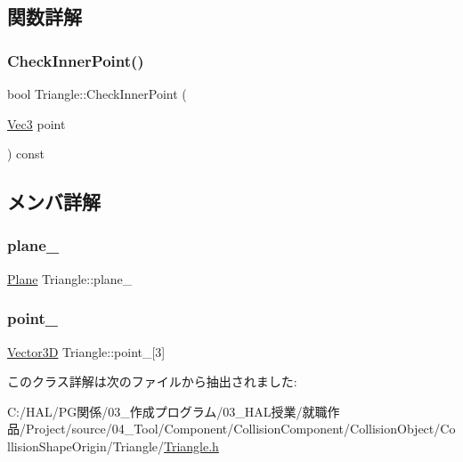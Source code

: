 \subsection{関数詳解}
\mbox{\label{class_triangle_ac5d6a4c5f2bfda5cdc56c89a294fb46e}} 
\subsubsection{\texorpdfstring{Check\+Inner\+Point()}{CheckInnerPoint()}}
{\footnotesize\ttfamily bool Triangle\+::\+Check\+Inner\+Point (\begin{DoxyParamCaption}\item[{\mbox{\hyperlink{_vector3_d_8h_ab16f59e4393f29a01ec8b9bbbabbe65d}{Vec3}}}]{point }\end{DoxyParamCaption}) const\hspace{0.3cm}{\ttfamily [inline]}}



\subsection{メンバ詳解}
\mbox{\label{class_triangle_a93586199c2c173771f2e167f477eaa70}} 
\subsubsection{\texorpdfstring{plane\+\_\+}{plane\_}}
{\footnotesize\ttfamily \mbox{\hyperlink{class_plane}{Plane}} Triangle\+::plane\+\_\+}

\mbox{\label{class_triangle_ab25f2be0ff148b58f1db904ad050353e}} 
\subsubsection{\texorpdfstring{point\+\_\+}{point\_}}
{\footnotesize\ttfamily \mbox{\hyperlink{class_vector3_d}{Vector3D}} Triangle\+::point\+\_\+\mbox{[}3\mbox{]}}



このクラス詳解は次のファイルから抽出されました\+:\begin{DoxyCompactItemize}
\item 
C\+:/\+H\+A\+L/\+P\+G関係/03\+\_\+作成プログラム/03\+\_\+\+H\+A\+L授業/就職作品/\+Project/source/04\+\_\+\+Tool/\+Component/\+Collision\+Component/\+Collision\+Object/\+Collision\+Shape\+Origin/\+Triangle/\mbox{\hyperlink{_triangle_8h}{Triangle.\+h}}\end{DoxyCompactItemize}
